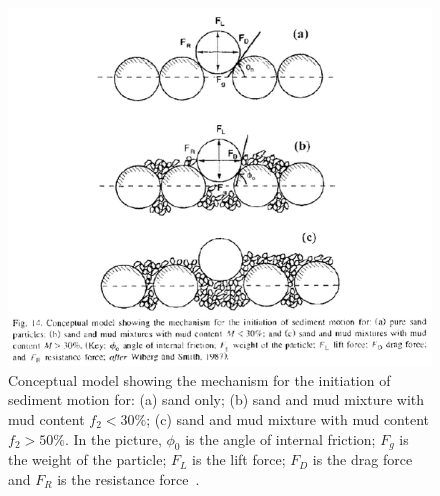 \begin{figure}[H]
\begin{center}
\includegraphics[trim=0cm 2.5cm 0cm 0cm, clip=true, scale=0.5,angle=0]{graphics/Mixed-fig001.png}
\caption{Conceptual model showing the mechanism for the initiation of sediment motion for: (a) sand only; (b) sand and mud mixture with mud content $f_2 < 30\%$; (c) sand and mud mixture with mud content $f_2 > 50\%$. In the picture, $\phi_0$ is the angle of internal friction; $F_g$ is the weight of the particle; $F_L$ is the lift force; $F_D$ is the drag force and $F_R$ is the resistance force~\cite{deLinaresthesis}.}\label{fig:mixed_regime}
\end{center}
\end{figure}


